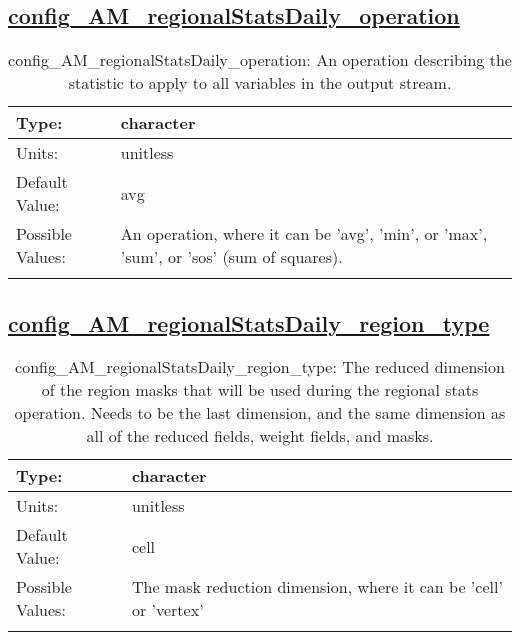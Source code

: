 \subsection[config\_AM\_regionalStatsDaily\_operation]{\hyperref[sec:nm_tab_AM_regionalStatsDaily]{config\_AM\_regionalStatsDaily\_operation}}
\label{subsec:nm_sec_config_AM_regionalStatsDaily_operation}
\begin{center}
\begin{longtable}{| p{2.0in} || p{4.0in} |}
    \hline
    Type: & character \\
    \hline
    Units: & \si{unitless} \\
    \hline
    Default Value: & avg \\
    \hline
    Possible Values: & An operation, where it can be 'avg', 'min', or 'max', 'sum', or 'sos' (sum of squares). \\
    \hline
    \caption{config\_AM\_regionalStatsDaily\_operation: An operation describing the statistic to apply to all variables in the output stream.}
\end{longtable}
\end{center}
\subsection[config\_AM\_regionalStatsDaily\_region\_type]{\hyperref[sec:nm_tab_AM_regionalStatsDaily]{config\_AM\_regionalStatsDaily\_region\_type}}
\label{subsec:nm_sec_config_AM_regionalStatsDaily_region_type}
\begin{center}
\begin{longtable}{| p{2.0in} || p{4.0in} |}
    \hline
    Type: & character \\
    \hline
    Units: & \si{unitless} \\
    \hline
    Default Value: & cell \\
    \hline
    Possible Values: & The mask reduction dimension, where it can be 'cell' or 'vertex' \\
    \hline
    \caption{config\_AM\_regionalStatsDaily\_region\_type: The reduced dimension of the region masks that will be used during the regional stats operation. Needs to be the last dimension, and the same dimension as all of the reduced fields, weight fields, and masks.}
\end{longtable}
\end{center}
